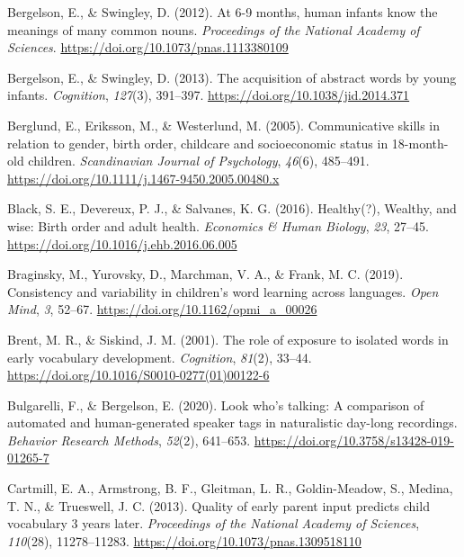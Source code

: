 \documentclass[
  english,
  man,floatsintext]{apa6}
\newlength{\cslhangindent}
\newenvironment{CSLReferences}[2] %
 {%
  \setlength{\parindent}{0pt}
  \ifodd #1 \everypar{\setlength{\hangindent}{\cslhangindent}}\ignorespaces\fi
  \ifnum #2 > 0
  \setlength{\parskip}{#2\baselineskip}
  \fi
 }%
 {}
\begin{document}
\begin{CSLReferences}{1}{0}
\leavevmode{}%
Bergelson, E., \& Swingley, D. (2012). At 6-9 months, human infants know the meanings of many common nouns. \emph{Proceedings of the National Academy of Sciences}. \url{https://doi.org/10.1073/pnas.1113380109}

\leavevmode{}%
Bergelson, E., \& Swingley, D. (2013). The acquisition of abstract words by young infants. \emph{Cognition}, \emph{127}(3), 391--397. \url{https://doi.org/10.1038/jid.2014.371}

\leavevmode{}%
Berglund, E., Eriksson, M., \& Westerlund, M. (2005). Communicative skills in relation to gender, birth order, childcare and socioeconomic status in 18-month-old children. \emph{Scandinavian Journal of Psychology}, \emph{46}(6), 485--491. \url{https://doi.org/10.1111/j.1467-9450.2005.00480.x}

\leavevmode{}%
Black, S. E., Devereux, P. J., \& Salvanes, K. G. (2016). Healthy(?), Wealthy, and wise: Birth order and adult health. \emph{Economics \& Human Biology}, \emph{23}, 27--45. \url{https://doi.org/10.1016/j.ehb.2016.06.005}

\leavevmode{}%
Braginsky, M., Yurovsky, D., Marchman, V. A., \& Frank, M. C. (2019). Consistency and variability in children's word learning across languages. \emph{Open Mind}, \emph{3}, 52--67. \url{https://doi.org/10.1162/opmi_a_00026}

\leavevmode{}%
Brent, M. R., \& Siskind, J. M. (2001). The role of exposure to isolated words in early vocabulary development. \emph{Cognition}, \emph{81}(2), 33--44. \url{https://doi.org/10.1016/S0010-0277(01)00122-6}

\leavevmode{}%
Bulgarelli, F., \& Bergelson, E. (2020). Look who's talking: A comparison of automated and human-generated speaker tags in naturalistic day-long recordings. \emph{Behavior Research Methods}, \emph{52}(2), 641--653. \url{https://doi.org/10.3758/s13428-019-01265-7}

\leavevmode{}%
Cartmill, E. A., Armstrong, B. F., Gleitman, L. R., Goldin-Meadow, S., Medina, T. N., \& Trueswell, J. C. (2013). Quality of early parent input predicts child vocabulary 3 years later. \emph{Proceedings of the National Academy of Sciences}, \emph{110}(28), 11278--11283. \url{https://doi.org/10.1073/pnas.1309518110}


\end{CSLReferences}
\end{document}

